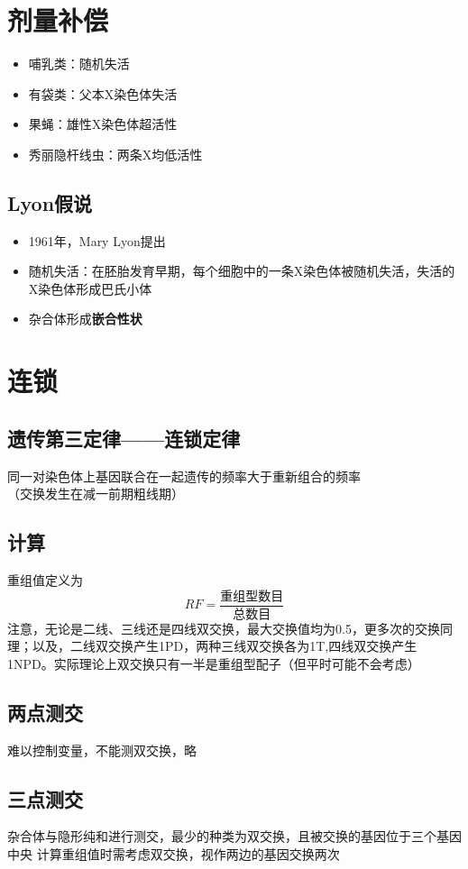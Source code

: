 \documentclass[a4paper, 12pt]{report}
\begin{document}
  \section{剂量补偿}
  \begin{itemize}
    \item 哺乳类：随机失活
    \item 有袋类：父本X染色体失活
    \item 果蝇：雄性X染色体超活性
    \item 秀丽隐杆线虫：两条X均低活性
  \end{itemize}
  \subsection{Lyon假说}
  \begin{itemize}
    \item 1961年，Mary Lyon提出
    \item 随机失活：在胚胎发育早期，每个细胞中的一条X染色体被随机失活，失活的X染色体形成巴氏小体
    \item 杂合体形成\textbf{嵌合性状}
  \end{itemize}
  \section{连锁}
  \subsection{遗传第三定律——连锁定律}
  同一对染色体上基因联合在一起遗传的频率大于重新组合的频率\\
  （交换发生在减一前期粗线期）
  \subsection{计算}
  重组值定义为
  \[RF=\frac{\text{重组型数目}}{\text{总数目}}\]
  注意，无论是二线、三线还是四线双交换，最大交换值均为0.5，更多次的交换同理；以及，二线双交换产生1PD，两种三线双交换各为1T,四线双交换产生1NPD。实际理论上双交换只有一半是重组型配子（但平时可能不会考虑）
  \subsection{两点测交}
  难以控制变量，不能测双交换，略
  \subsection{三点测交}
  杂合体与隐形纯和进行测交，最少的种类为双交换，且被交换的基因位于三个基因中央
  计算重组值时需考虑双交换，视作两边的基因交换两次
\end{document}
